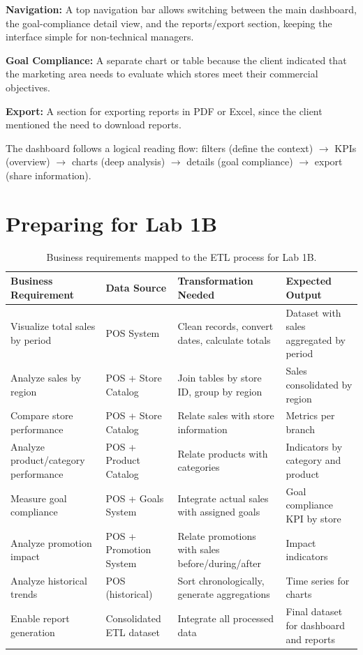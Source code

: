 \documentclass[12pt,a4paper]{article}
\begin{document}
\textbf{Navigation:} A top navigation bar allows switching between the main dashboard, the goal-compliance detail view, and the reports/export section, keeping the interface simple for non-technical managers.

\textbf{Goal Compliance:} A separate chart or table because the client indicated that the marketing area needs to evaluate which stores meet their commercial objectives.

\textbf{Export:} A section for exporting reports in PDF or Excel, since the client mentioned the need to download reports.

The dashboard follows a logical reading flow: filters (define the context) $\rightarrow$ KPIs (overview) $\rightarrow$ charts (deep analysis) $\rightarrow$ details (goal compliance) $\rightarrow$ export (share information).

\section{Preparing for Lab 1B}

\begin{table}[H]
\centering
\small
\begin{tabular}{p{3.2cm} p{2.8cm} p{3.8cm} p{3.2cm}}
\toprule
\textbf{Business Requirement} & \textbf{Data Source} & \textbf{Transformation Needed} & \textbf{Expected Output}\\
\midrule
Visualize total sales by period & POS System & Clean records, convert dates, calculate totals & Dataset with sales aggregated by period\\
Analyze sales by region & POS + Store Catalog & Join tables by store ID, group by region & Sales consolidated by region\\
Compare store performance & POS + Store Catalog & Relate sales with store information & Metrics per branch\\
Analyze product/category performance & POS + Product Catalog & Relate products with categories & Indicators by category and product\\
Measure goal compliance & POS + Goals System & Integrate actual sales with assigned goals & Goal compliance KPI by store\\
Analyze promotion impact & POS + Promotion System & Relate promotions with sales before/during/after & Impact indicators\\
Analyze historical trends & POS (historical) & Sort chronologically, generate aggregations & Time series for charts\\
Enable report generation & Consolidated ETL dataset & Integrate all processed data & Final dataset for dashboard and reports\\
\bottomrule
\end{tabular}
\caption{Business requirements mapped to the ETL process for Lab 1B.}
\end{table}
\end{document}
